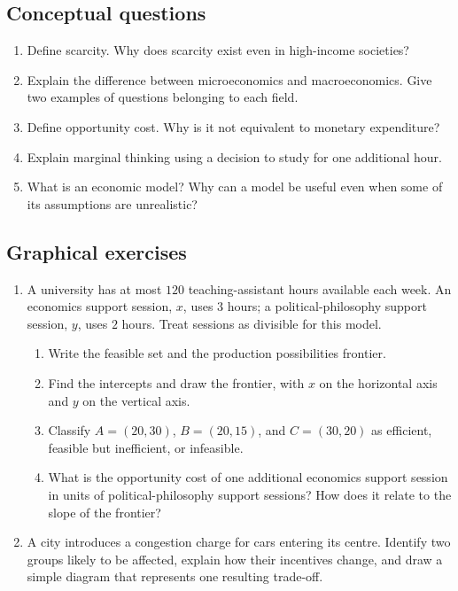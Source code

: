 \subsection*{Conceptual questions}
\begin{enumerate}[label=\arabic*.]
  \item Define scarcity. Why does scarcity exist even in high-income societies?
  \item Explain the difference between microeconomics and macroeconomics. Give two examples of questions belonging to each field.
  \item Define opportunity cost. Why is it not equivalent to monetary expenditure?
  \item Explain marginal thinking using a decision to study for one additional hour.
  \item What is an economic model? Why can a model be useful even when some of its assumptions are unrealistic?
\end{enumerate}

\subsection*{Graphical exercises}
\begin{enumerate}[resume,label=\arabic*.]
  \item A university has at most $120$ teaching-assistant hours available each week. An economics support session, $x$, uses $3$ hours; a political-philosophy support session, $y$, uses $2$ hours. Treat sessions as divisible for this model.
  \begin{enumerate}[label=(\alph*)]
    \item Write the feasible set and the production possibilities frontier.
    \item Find the intercepts and draw the frontier, with $x$ on the horizontal axis and $y$ on the vertical axis.
    \item Classify $A=(20,30)$, $B=(20,15)$, and $C=(30,20)$ as efficient, feasible but inefficient, or infeasible.
    \item What is the opportunity cost of one additional economics support session in units of political-philosophy support sessions? How does it relate to the slope of the frontier?
  \end{enumerate}
  \item A city introduces a congestion charge for cars entering its centre. Identify two groups likely to be affected, explain how their incentives change, and draw a simple diagram that represents one resulting trade-off.
\end{enumerate}

